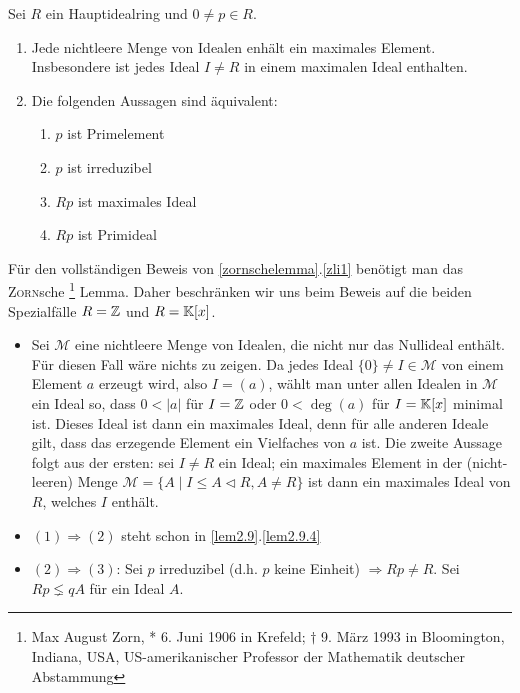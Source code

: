\begin{mysatz}\label{zornschelemma}

    Sei $R$ ein Hauptidealring und $0 \neq p \in R$.
    \begin{enumerate}
        \item Jede nichtleere Menge von Idealen enhält ein maximales Element. Insbesondere ist jedes Ideal $I \neq R$ in einem maximalen Ideal enthalten. \label{zli1}
        \item Die folgenden Aussagen sind äquivalent:
            \begin{enumerate}
                \item $p$ ist Primelement
                \item $p$ ist irreduzibel
                \item $Rp$ ist maximales Ideal
                \item $Rp$ ist Primideal
            \end{enumerate}
    \end{enumerate}
    Für den vollständigen Beweis von \ref{zornschelemma}.\ref{zli1} benötigt man das 
    \textsc{Zorn}sche \footnote{Max August Zorn, * 6. Juni 1906 in Krefeld; $\dagger$ 9. März 1993 in Bloomington, Indiana, USA, US-amerikanischer Professor der Mathematik deutscher Abstammung} Lemma. 
    Daher beschränken wir uns beim Beweis auf die beiden Spezialfälle $R = \mathbb{Z}$ und $R = \mathbb{K}[x]$.
    \begin{itemize}
        \item Sei $\mathcal{M}$ eine nichtleere Menge von Idealen, die nicht nur das Nullideal enthält. Für diesen Fall wäre nichts zu zeigen.
            Da jedes Ideal $\{0\} \neq I\in \mathcal{M}$ von einem Element $a$ erzeugt wird, also $I=(a)$,
            wählt man unter allen Idealen in $\mathcal{M}$ ein Ideal so, dass $0 < |a|$ für $I = \mathbb{Z}$ oder $0 < \deg(a)$ für $I = \mathbb{K}[x]$ minimal ist.
            Dieses Ideal ist dann ein maximales Ideal, denn für alle anderen Ideale gilt, dass das erzegende Element ein Vielfaches von $a$ ist.
            Die zweite Aussage folgt aus der ersten: sei $I \neq R$ ein Ideal; ein maximales Element in der (nicht-leeren) Menge 
            $\mathcal{M} = \{ A \mid I \leq A \lhd R, A \neq R\}$ ist dann ein maximales Ideal von $R$, welches $I$ enthält.
        \item $(1) \Rightarrow (2)$ steht schon in \ref{lem2.9}.\ref{lem2.9.4}
        \item $(2)\Rightarrow(3)$: Sei $p$ irreduzibel (d.h. $p$ keine Einheit) $\Rightarrow Rp \neq R$. Sei $Rp \lneq q A$ für ein Ideal $A$.

\end{itemize}
\end{mysatz}
